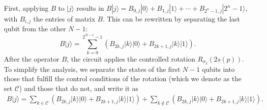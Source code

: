 \documentclass[10pt,letterpaper]{article} %
\begin{document}
First, applying $B$ to $|j\rangle$ results in $B|j\rangle = B_{0,j} |0\rangle + B_{1,j} |1 \rangle + \cdots + B_{2^n-1,j}|2^n-1\rangle$,
with $B_{i,j}$ the entries of matrix $B$.
This can be rewritten by separating the last qubit from the other $N-1$:
\begin{equation}
B|j\rangle = \sum_{k=0}^{2^{N-1}-1} \left( B_{2k,j} |k\rangle|0\rangle  + B_{2k+1,j} |k \rangle |1\rangle  \right).
\end{equation}
After the operator $B$, the circuit applies the  controlled rotation $R_{\sigma_3}(2s(p))$.
To simplify the analysis, we separate the states of
the first $N-1$ qubits into those that fulfill the control conditions of the rotation
(which we denote as the set $\mathcal{C}$)
and those that do not, and write it as
\begin{align}
B|j\rangle = 
   \sum_{k \in \mathcal{C}} \left( B_{2k,j} |k\rangle|0\rangle 
                                     + B_{2k+1,j} |k \rangle |1\rangle  \right) 
   + \sum_{k \not\in \mathcal{C}} \left( B_{2k,j} |k\rangle|0\rangle  
                                      + B_{2k+1,j} |k \rangle |1\rangle  \right).
\end{align}
\end{document}
